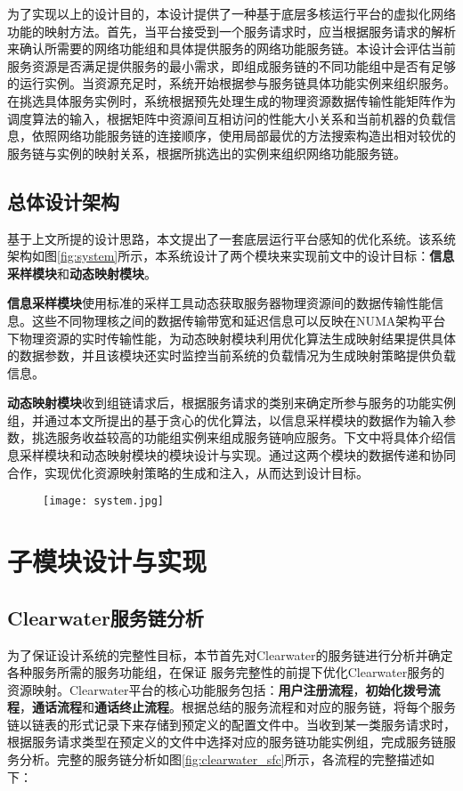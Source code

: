为了实现以上的设计目的，本设计提供了一种基于底层多核运行平台的虚拟化网络功能的映射方法。首先，当平台接受到一个服务请求时，应当根据服务请求的解析来确认所需要的网络功能组和具体提供服务的网络功能服务链。本设计会评估当前服务资源是否满足提供服务的最小需求，即组成服务链的不同功能组中是否有足够的运行实例。当资源充足时，系统开始根据参与服务链具体功能实例来组织服务。在挑选具体服务实例时，系统根据预先处理生成的物理资源数据传输性能矩阵作为调度算法的输入，根据矩阵中资源间互相访问的性能大小关系和当前机器的负载信息，依照网络功能服务链的连接顺序，使用局部最优的方法搜索构造出相对较优的服务链与实例的映射关系，根据所挑选出的实例来组织网络功能服务链。

\subsection{总体设计架构}

基于上文所提的设计思路，本文提出了一套底层运行平台感知的优化系统。该系统架构如图\ref{fig:system}所示，本系统设计了两个模块来实现前文中的设计目标：\textbf{信息采样模块}和\textbf{动态映射模块}。

\textbf{信息采样模块}使用标准的采样工具动态获取服务器物理资源间的数据传输性能信息。这些不同物理核之间的数据传输带宽和延迟信息可以反映在NUMA架构平台下物理资源的实时传输性能，为动态映射模块利用优化算法生成映射结果提供具体的数据参数，并且该模块还实时监控当前系统的负载情况为生成映射策略提供负载信息。

\textbf{动态映射模块}收到组链请求后，根据服务请求的类别来确定所参与服务的功能实例组，并通过本文所提出的基于贪心的优化算法，以信息采样模块的数据作为输入参数，挑选服务收益较高的功能组实例来组成服务链响应服务。下文中将具体介绍信息采样模块和动态映射模块的模块设计与实现。通过这两个模块的数据传递和协同合作，实现优化资源映射策略的生成和注入，从而达到设计目标。

\begin{figure}[!htp]
	\centering
	\texttt{[image: system.jpg]}
\end{figure}

\newpage

\section{子模块设计与实现}
\subsection{Clearwater服务链分析} 
为了保证设计系统的完整性目标，本节首先对Clearwater的服务链进行分析并确定各种服务所需的服务功能组，在保证
服务完整性的前提下优化Clearwater服务的资源映射。Clearwater平台的核心功能服务包括：\textbf{用户注册流程}，\textbf{初始化拨号流程}，\textbf{通话流程}和\textbf{通话终止流程}。根据总结的服务流程和对应的服务链，将每个服务链以链表的形式记录下来存储到预定义的配置文件中。当收到某一类服务请求时，根据服务请求类型在预定义的文件中选择对应的服务链功能实例组，完成服务链服务分析。完整的服务链分析如图\ref{fig:clearwater_sfc}所示，各流程的完整描述如下：


